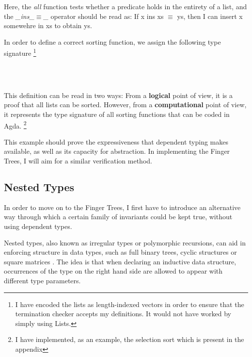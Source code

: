 \documentclass[12pt,twoside,notitlepage]{report}
\begin{document}
Here, the \textit{all} function tests whether a predicate holds in the entirety of a list, and the \textit{\_ins\_$\equiv$\_} operator should be read as: If x ins xs $\equiv$ ys, then I can insert x somewehre in xs to obtain ys.

In order to define a correct sorting function, we assign the following type signature \footnote{I have encoded the lists as length-indexed vectors in order to ensure that the termination checker accepts my definitions. It would not have worked by simply using Lists.}

\begin{code}
\\
\>[0]\<[2]%
\>[2] \AgdaSymbol{:}  \AgdaSymbol{\{} \AgdaSymbol{:} \AgdaSymbol{\}}  \AgdaSymbol{(} \AgdaSymbol{:}   \AgdaSymbol{)}  \AgdaSymbol{(} \AgdaSymbol{)}\<%
\\
\end{code}

This definition can be read in two ways: From a \textbf{logical} point of view, it is a proof that all lists can be sorted. However, from a \textbf{computational} point of view, it represents the type signature of all sorting functions that can be coded in Agda. \footnote{I have implemented, as an example, the selection sort which is present in the appendix}

This example should prove the expressiveness that dependent typing makes available, as well as its capacity for abstraction. In implementing the Finger Trees, I will aim for a similar verification method.

\subsection{Nested Types}

In order to move on to the Finger Trees, I first have to introduce an alternative way through which a certain family of invariants could be kept true, without using dependent types. 

Nested types\cite{nested_types}, also known as irregular types or polymorphic recursions, can aid in enforcing structure in data types, such as full binary trees, cyclic structures \cite{cyclic} or square matrices \cite{okasaki_matrix}. The idea is that when declaring an inductive data structure, occurrences of the type on the right hand side are allowed to appear with different type parameters.
\end{document}

